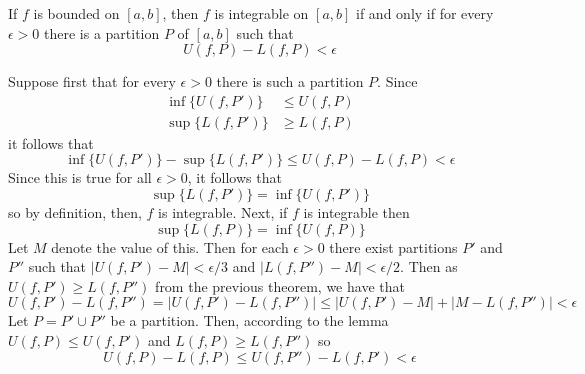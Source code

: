 \documentclass[12pt]{report}
\begin{document}
\begin{thm}{}{}
    If $f$ is bounded on $[a,b]$, then $f$ is integrable on $[a,b]$ if and only if for every $\epsilon > 0$ there is a partition $P$ of $[a,    b]$ such that $$U(f,P) - L(f,P) < \epsilon$$
\end{thm}
\begin{proof*}{}{}
    Suppose first that for every $\epsilon > 0$ there is such a partition $P$. Since \begin{align*}
        \inf\{U(f,P')\} &\leq U(f,P) \\
        \sup\{L(f,P')\} &\geq L(f,P)
    \end{align*}
    it follows that \begin{equation*}
        \inf\{U(f,P')\} - \sup\{L(f,P')\} \leq U(f,P) - L(f,P) < \epsilon
    \end{equation*}
    Since this is true for all $\epsilon > 0$, it follows that \begin{equation*}
        \sup\{L(f,P')\} = \inf\{U(f,P')\}
    \end{equation*}
    so by definition, then, $f$ is integrable. Next, if $f$ is integrable then \begin{equation*}
        \sup\{L(f,P)\} = \inf\{U(f,P)\}
    \end{equation*}
    Let $M$ denote the value of this. Then for each $\epsilon > 0$ there exist partitions $P'$ and $P''$ such that $|U(f,P') - M| <\epsilon/    3$ and $|L(f,P'') - M| < \epsilon/2$. Then as $U(f,P') \geq L(f,P'')$ from the previous theorem, we have that \begin{equation*}
        U(f,P') - L(f,P'') = |U(f,P') - L(f,P'')| \leq |U(f,P') - M| + |M - L(f,P'')| < \epsilon
    \end{equation*}
    Let $P = P' \cup P''$ be a partition. Then, according to the lemma $U(f,P) \leq U(f,P')$ and $L(f,P) \geq L(f,P'')$ so \begin{equation*}
		U(f,P) - L(f,P) \leq U(f,P'') - L(f,P') <\epsilon
	\end{equation*}
\end{proof*}
\end{document}
